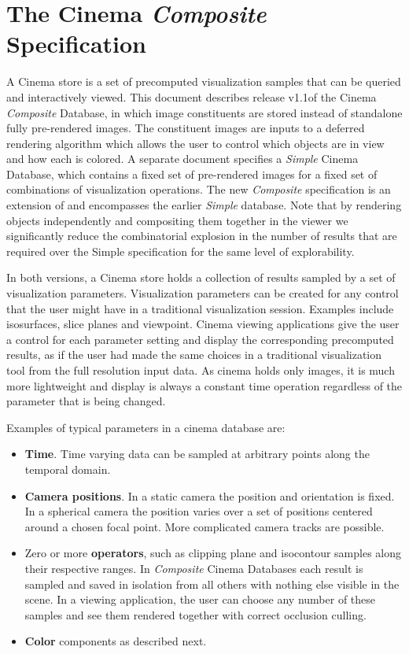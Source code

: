 \documentclass{article}
\newcommand{\CinemaSpecVersion} {v1.1}
\newcommand{\Composite} {\textit{Composite}\xspace}
\begin{document}
\section{The Cinema \Composite Specification}
A Cinema store is a set of precomputed visualization samples that can be queried and interactively viewed. This document describes release \CinemaSpecVersion of the Cinema \Composite Database, in which image constituents are stored instead of standalone fully pre-rendered images. The constituent images are inputs to a deferred rendering algorithm which allows the user to control which objects are in view and how each is colored. A separate document \cite{cinemaSimpleFileSpec} specifies a \textit{Simple} Cinema Database, which contains a fixed set of pre-rendered images for a fixed set of combinations of visualization operations. The new \Composite specification is an extension of and encompasses the earlier \textit{Simple} database. Note that by rendering objects independently and compositing them together in the viewer we significantly reduce the combinatorial explosion in the number of results that are required over the Simple specification for the same level of explorability.

In both versions, a Cinema store holds a collection of results sampled by a set of visualization parameters. Visualization parameters can be created for any control that the user might have in a traditional visualization session. Examples include isosurfaces, slice planes and viewpoint. Cinema viewing applications give the user a control for each parameter setting and display the corresponding precomputed results, as if the user had made the same choices in a traditional visualization tool from the full resolution input data. As cinema holds only images, it is much more lightweight and display is always a constant time operation regardless of the parameter that is being changed.

Examples of typical parameters in a cinema database are:
\begin{itemize}
\item \textbf{Time}. Time varying data can be sampled at arbitrary points along the temporal domain.
\item \textbf{Camera positions}. In a static camera the position and orientation is fixed. In a spherical camera the position varies over a set of positions centered around a chosen focal point. More complicated camera tracks are possible.
\item Zero or more \textbf{operators}, such as clipping plane and isocontour samples along their respective ranges. In \Composite Cinema Databases each result is sampled and saved in isolation from all others with nothing else visible in the scene. In a viewing application, the user can choose any number of these samples and see them rendered together with correct occlusion culling.
\item \textbf{Color} components as described next.
\end{itemize}
\end{document}
